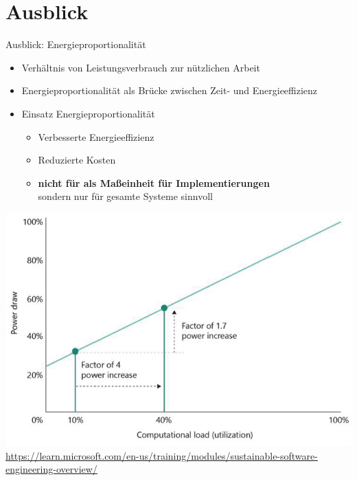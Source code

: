 \section{Ausblick}
\begin{frame}{Ausblick: Energieproportionalität \cite{wong_retrospective_2015}}
				\begin{itemize}
					\item Verhältnis von Leistungsverbrauch zur nützlichen Arbeit
					\item  Energieproportionalität als Brücke zwischen Zeit- und Energieeffizienz
				\item Einsatz Energieproportionalität
				 \begin{itemize}
					 \item Verbesserte Energieeffizienz 
					 \item Reduzierte Kosten 
					 \item \textbf<2->{nicht für als Maßeinheit für Implementierungen }\\sondern nur für gesamte Systeme sinnvoll
					\end{itemize}
			\end{itemize}
		\hspace*{2cm}
		\includegraphics[width=.65\linewidth]{../Figures/energiePropor.png}
		\hspace*{\fill}\\
		\hspace*{\fill} \href{https://learn.microsoft.com/en-us/training/modules/sustainable-software-engineering-overview/}%
		               {\tiny https://learn.microsoft.com/en-us/training/modules/sustainable-software-engineering-overview/}
\end{frame}
